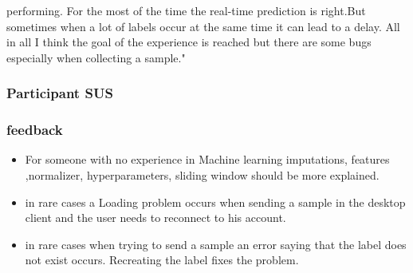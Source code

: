 performing. For the most of the time the real-time prediction is right.But sometimes when a lot of labels occur at the same time it can lead to a delay. All in all I think the goal of the experience is reached but there are some bugs especially when collecting a sample."

\subsubsection{Participant SUS}
\begin{table}[h]
\end{table}
\subsubsection{feedback}
\begin{itemize}
  \item For someone with no experience in Machine learning imputations, features ,normalizer, hyperparameters, sliding window should be more explained.
  \newline
  \item in rare cases a Loading problem occurs when sending a sample in the desktop client and the user needs to reconnect to his account.
  \newline
  \item in rare cases when trying to send a sample an error saying that the label does not exist occurs. Recreating the label fixes the problem.
  \newline
\end{itemize}